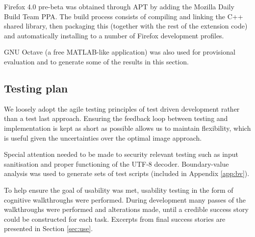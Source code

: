 Firefox 4.0 pre-beta was obtained through APT by adding the Mozilla Daily Build Team PPA. The build process consists of compiling and linking the C++ shared library, then packaging this (together with the rest of the extension code) and automatically installing to a number of Firefox development profiles.        

GNU Octave (a free MATLAB-like application) was also used for provisional evaluation and to generate some of the results in this section.


\subsection{Testing plan}

We loosely adopt the agile testing principles of test driven development rather than a test last approach. Ensuring the feedback loop between testing and implementation is kept as short as possible allows us to maintain flexibility, which is useful given the uncertainties over the optimal image approach.

Special attention needed to be made to security relevant testing such as input sanitisation and proper functioning of the UTF-8 decoder. Boundary-value analysis was used to generate sets of test scripts (included in Appendix \ref{app:bv}).

To help ensure the goal of usability was met, usability testing in the form of cognitive walkthroughs were performed. During development many passes of the walkthroughs were performed and alterations made, until a credible success story could be constructed for each task. Excerpts from final success stories are presented in Section \ref{sec:use}.

